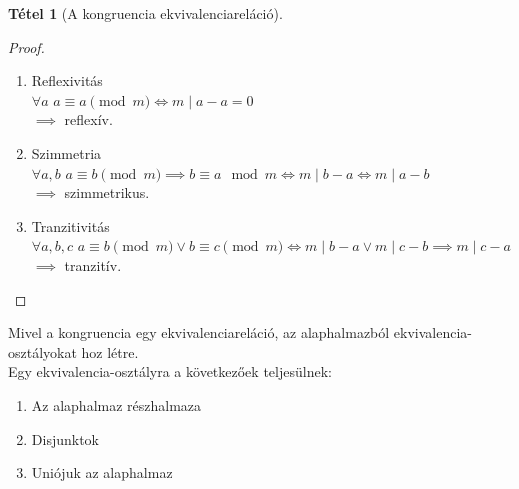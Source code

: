 \documentclass{article}
\newtheorem{theorem}{Tétel}
\begin{document}
\begin{theorem}[A kongruencia ekvivalenciareláció]
\end{theorem}
\begin{proof} $ $\\
\begin{enumerate}
    \item Reflexivitás \\
    $\forall a$ $a \equiv a \pmod{m} \iff m \mid a - a = 0$\\
    $\implies$ reflexív.
    \item Szimmetria \\
    $\forall a,b$ $a \equiv b \pmod{m} \implies b \equiv a \mod{m} \iff m \mid b - a \iff m \mid a - b$ \\
    $\implies$ szimmetrikus.
    \item Tranzitivitás \\
    $\forall a,b,c$ $a \equiv b \pmod{m} \vee b \equiv c \pmod{m} \iff m \mid b - a \vee m \mid c - b \implies m \mid c - a$ \\
    $\implies$ tranzitív.
\end{enumerate}
\end{proof}

Mivel a kongruencia egy ekvivalenciareláció, az alaphalmazból ekvivalencia-osztályokat hoz létre. \\
Egy ekvivalencia-osztályra a következőek teljesülnek: \\
\begin{enumerate}
    \item Az alaphalmaz részhalmaza
    \item Disjunktok
    \item Uniójuk az alaphalmaz
\end{enumerate}
\end{document}
